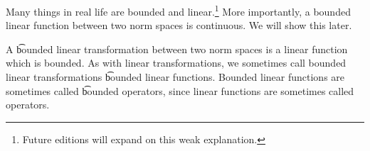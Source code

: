 

Many things in real life are bounded and linear.\footnote{Future editions will expand on this weak explanation.}
More importantly, a bounded linear function between two norm spaces is continuous.
We will show this later.


A \t{bounded linear transformation}
between two norm spaces is
a linear function which is
bounded.
As with linear transformations, we sometimes call bounded linear transformations \t{bounded linear functions}.
Bounded linear functions
are sometimes called
\t{bounded operators},
since linear functions are
sometimes called operators.

\blankpage
